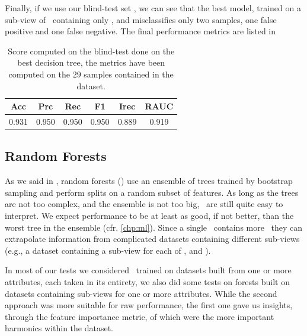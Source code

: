 Finally, if we use our blind-test set \db, we can see that the best model, trained on a sub-view of
\an\ containing only \an[2], and \an[12] misclassifies only two samples, one false positive and one
false negative. The final performance metrics are listed in 
\begin{table}[!ht]
	\caption{Score computed on the blind-test done on the best decision tree, the metrics have
		been computed on the $29$ samples contained in the dataset.}\label{tbl:blind-test-bdt}

	\bigskip
	\setlength{\tabcolsep}{6pt}
	\centering
	\begin{tabular}{cccccc}
		\toprule
		\textbf{Acc} & \textbf{Prc} & \textbf{Rec} & \textbf{F1} & \textbf{Irec} & \textbf{RAUC} \\
		\midrule
		0.931        & 0.950        & 0.950        & 0.950       & 0.889         & 0.919         \\
		\bottomrule
	\end{tabular}
\end{table}

\subsection{Random Forests}
\label{sec:qrp-rf}
As we said in , random forests (\rfs) use an ensemble of trees trained by bootstrap
sampling and perform splits on a random subset of features. As long as the trees are not too
complex, and the ensemble is not too big, \rfs\ are still quite easy to interpret. We expect
performance to be at least as good, if not better, than the worst tree in the ensemble (cfr. \cref{chp:ml}). Since a single \rf\ contains more \dts\, they can extrapolate information from complicated datasets containing different sub-views (e.g., a dataset containing a sub-view for each of \an, \bn and \cnmod).

In most of our tests we considered \rfs\ trained on datasets built from one or more attributes, each
taken in its entirety, we also did some tests on forests built on datasets containing sub-views for
one or more attributes. While the second approach was more suitable for raw performance, the first
one gave us insights, through the feature importance metric, of which were the more important
harmonics within the dataset.

